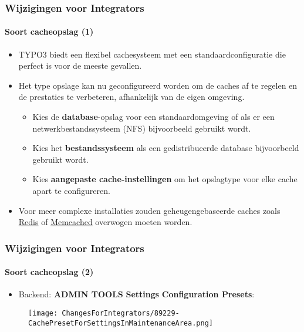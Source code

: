 \begin{frame}[fragile]
	\frametitle{Wijzigingen voor Integrators}
	\framesubtitle{Soort cacheopslag (1)}

	\begin{itemize}

		\item TYPO3 biedt een flexibel cachesysteem met een standaardconfiguratie
			die perfect is voor de meeste gevallen.
		\item Het type opslage kan nu geconfigureerd worden om de caches af te regelen en
			de prestaties te verbeteren, afhankelijk van de eigen omgeving.

			\begin{itemize}
				\item Kies de \textbf{database}-opslag voor een standaardomgeving
					of als er een netwerkbestandssysteem (NFS) bijvoorbeeld gebruikt wordt.
				\item Kies het \textbf{bestandssysteem} als een gedistribueerde database
					bijvoorbeeld gebruikt wordt.
				\item Kies \textbf{aangepaste cache-instellingen} om het opslagtype
					voor elke cache apart te configureren.
			\end{itemize}

		\item Voor meer complexe installaties zouden geheugengebaseerde caches zoals
			\href{https://redis.io/}{Redis}
			of
			\href{https://memcached.org/}{Memcached}
			overwogen moeten worden.

	\end{itemize}

\end{frame}


%

\begin{frame}[fragile]
	\frametitle{Wijzigingen voor Integrators}
	\framesubtitle{Soort cacheopslag (2)}

	\begin{itemize}

		\item Backend: \textbf{ADMIN TOOLS} \hspace{0.1cm}\textbf{Settings} \hspace{0.1cm}\textbf{Configuration Presets}:
		\end{itemize}

	\begin{figure}
		\texttt{[image: ChangesForIntegrators/89229-CachePresetForSettingsInMaintenanceArea.png]}
	\end{figure}

\end{frame}

